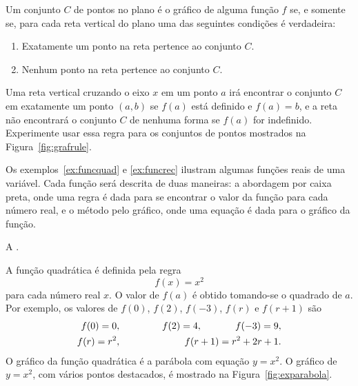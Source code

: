 Um conjunto $C$ de pontos no plano é o gráfico de alguma função $f$ se,
e somente se, para cada reta vertical do plano uma das seguintes
condições é verdadeira:
\begin{enumerate}[(1)]
\item Exatamente um ponto na reta pertence ao conjunto $C$.
\item Nenhum ponto na reta pertence ao conjunto $C$.
\end{enumerate}

Uma reta vertical cruzando o eixo $x$ em um ponto $a$ irá encontrar
o conjunto $C$ em exatamente um ponto $(a, b)$ se $f(a)$ está definido
e $f(a) = b$, e a reta não encontrará o conjunto $C$ de nenhuma forma
se $f(a)$ for indefinido. Experimente usar essa regra para os conjuntos
de pontos mostrados na Figura~\ref{fig:grafrule}.


Os exemplos~\ref{ex:funcquad} e \ref{ex:funcrec} ilustram algumas funções
reais de uma variável. Cada função será
descrita de duas maneiras: a abordagem por caixa preta, onde uma regra é
dada para se encontrar o valor da função para cada número real, e o método
pelo gráfico, onde uma equação é dada para o gráfico da função.

\begin{example}\label{ex:funcquad}
A .

A função quadrática é definida pela regra
\[
  f(x) = x^2
\]
para cada número real $x$. O valor de $f(a)$ é obtido tomando-se o
quadrado de $a$. Por exemplo, os valores de $f(0)$, $f(2)$, $f(-3)$,
$f(r)$ e $f(r+1)$ são
\begin{eqnarray*}
   f(0) = 0, && \hspace{0.1\textwidth} f(2) = 4,
  \hspace{0.1\textwidth} f(-3) = 9,  \\
 f(r) = r^2, && \hspace{0.1\textwidth} f(r+1) = r^2 + 2r + 1.
\end{eqnarray*}
O gráfico da função quadrática é a parábola com equação $y = x^2$.
O gráfico de $y = x^2$, com vários pontos destacados, é mostrado
na Figura~\ref{fig:exparabola}.
\end{example}


